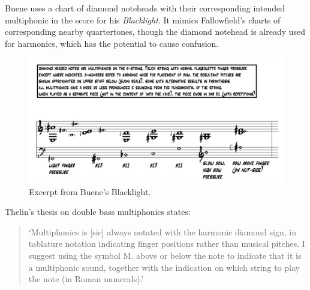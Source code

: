 Buene uses a chart of diamond noteheads with their corresponding intended multiphonic in the score for his \emph{Blacklight}.
It mimics Fallowfield's charts of corresponding nearby quartertones, though the diamond notehead is already used for harmonics, which has the potential to cause confusion.
\begin{figure}
  \includegraphics[width=\linewidth]{./resources/bueneMultiphonicNotation.png}
  \caption{Excerpt from Buene's Blacklight.}
\label{fig:Excerpt from Buene's Blacklight}
\end{figure}

Thelin's thesis on double bass multiphonics states:
\begin{quotation}
    `Multiphonics is [sic] always notated with the harmonic diamond sign, in tablature notation
indicating finger positions rather than musical pitches. I suggest using the symbol M. above or
below the note to indicate that it is a multiphonic sound, together with the indication on which
string to play the note (in Roman numerals).'\autocite[6]{thelinMultiphonicsDoubleBass2011}
\end{quotation}

